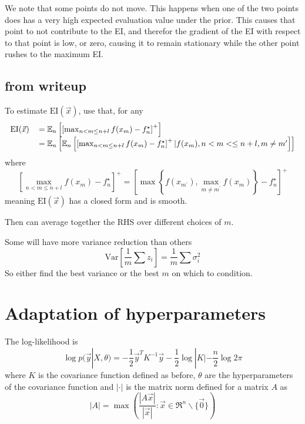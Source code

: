 \documentclass[phd,tocprelim]{cornell}
\begin{document}
We note that some points do not move. This happens when one of the two points does has a very high expected evaluation value under the prior. This causes that point to not contribute to the EI, and therefor the gradient of the EI with respect to that point is low, or zero, causing it to remain stationary while the other point rushes to the maximum EI.

\subsection{from writeup}

To estimate $\mbox{EI}(\vec{x})$, use that, for any
\begin{equation}
 \begin{tabular}{rl} $\mbox{EI}(\vec{x})$ & $= \mathbb{E}_{n} \left[ \left[ \max_{n < m \leq n+l} f(x_{m}) - f_{n}^{\star} \right]^{+} \right]$ \\
  & $= \mathbb{E}_{n} \left[ \mathbb{E}_{n} \left[ \left[ \max_{n < m \leq n + l} f(x_{m}) - f^{\star}_{n} \right]^{+} | f(x_{m}), n < m < \leq n + l, m \neq m^{\prime} \right] \right]$ \end{tabular}
\end{equation}
where
\begin{equation}
 \left[ \max_{n < m \leq n + l} f(x_{m}) - f^{\star}_{n} \right]^{+} = \left[ \max \left\{ f(x_{m^{\prime}}), \max_{m \neq m^{\prime}} f(x_{m}) \right\} - f_{n}^{\star} \right]^{+}
\end{equation}
meaning $\mbox{EI}(\vec{x})$ has a closed form and is smooth.

Then can average together the RHS over different choices of $m$.

Some will have more variance reduction than others
\begin{equation}
 \mbox{Var}\left[\frac{1}{m} \sum z_{i}\right] = \frac{1}{m} \sum \sigma_{i}^{2}
\end{equation}
So either find the best variance or the best $m$ on which to condition.


\section{Adaptation of hyperparameters} %
\label{sec:Adaptation of hyperparameters}

\cite{RW}
The log-likelihood is
\begin{equation}
    \log p(\vec{y}|X, \theta) = -\frac{1}{2}\vec{y}^{T}K^{-1}\vec{y} - \frac{1}{2}\log|K| - \frac{n}{2} \log 2\pi
\end{equation}
where $K$ is the covariance function defined as before, $\theta$ are the hyperparameters of the covariance function and $|\cdot|$ is the matrix norm defined for a matrix $A$ as
\begin{equation}
    |A| = \max \left( \frac{|A\vec{x}|}{|\vec{x}|} : \vec{x} \in \Re^{n}\backslash\{\vec{0}\} \right)
\end{equation}
\end{document}
